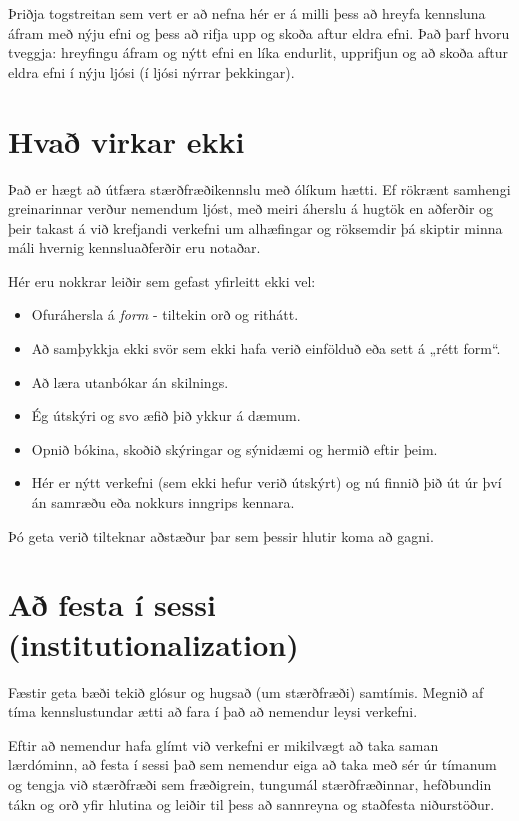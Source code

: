 \documentclass[
  icelandic,
]{book}
\providecommand{\tightlist}{%
  \setlength{\itemsep}{0pt}\setlength{\parskip}{0pt}}
\begin{document}
Þriðja togstreitan sem vert er að nefna hér er á milli þess að hreyfa kennsluna áfram með nýju efni og þess að rifja upp og skoða aftur eldra efni. Það þarf hvoru tveggja: hreyfingu áfram og nýtt efni en líka endurlit, upprifjun og að skoða aftur eldra efni í nýju ljósi (í ljósi nýrrar þekkingar).

\section{Hvað virkar ekki}\label{hvauxf0-virkar-ekki}

Það er hægt að útfæra stærðfræðikennslu með ólíkum hætti. Ef rökrænt samhengi greinarinnar verður nemendum ljóst, með meiri áherslu á hugtök en aðferðir og þeir takast á við krefjandi verkefni um alhæfingar og röksemdir þá skiptir minna máli hvernig kennsluaðferðir eru notaðar.

Hér eru nokkrar leiðir sem gefast yfirleitt ekki vel:

\begin{itemize}
\tightlist
\item
  Ofuráhersla á \emph{form} - tiltekin orð og rithátt.
\item
  Að samþykkja ekki svör sem ekki hafa verið einfölduð eða sett á „rétt form``.
\item
  Að læra utanbókar án skilnings.
\item
  Ég útskýri og svo æfið þið ykkur á dæmum.
\item
  Opnið bókina, skoðið skýringar og sýnidæmi og hermið eftir þeim.
\item
  Hér er nýtt verkefni (sem ekki hefur verið útskýrt) og nú finnið þið út úr því án samræðu eða nokkurs inngrips kennara.
\end{itemize}

Þó geta verið tilteknar aðstæður þar sem þessir hlutir koma að gagni.

\section{Að festa í sessi (institutionalization)}\label{auxf0-festa-uxed-sessi-institutionalization}

Fæstir geta bæði tekið glósur og hugsað (um stærðfræði) samtímis. Megnið af tíma kennslustundar ætti að fara í það að nemendur leysi verkefni.

Eftir að nemendur hafa glímt við verkefni er mikilvægt að taka saman lærdóminn, að festa í sessi það sem nemendur eiga að taka með sér úr tímanum og tengja við stærðfræði sem fræðigrein, tungumál stærðfræðinnar, hefðbundin tákn og orð yfir hlutina og leiðir til þess að sannreyna og staðfesta niðurstöður.
\end{document}
